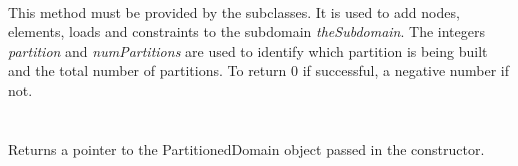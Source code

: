  \\
This method must be provided by the subclasses. It is used to add
nodes, elements, loads and constraints to the subdomain {\em
theSubdomain}. The integers {\em partition} and {\em numPartitions}
are used to identify which partition is being built and the total
number of partitions. To return $0$ if successful, a negative number
if not. \\


 \\
 \\
Returns a pointer to the PartitionedDomain object passed in the constructor.\\


